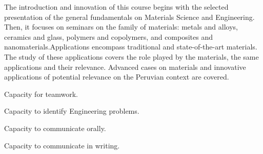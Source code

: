 
\begin{syllabus}


\begin{justification}
The introduction and innovation of this course begins with the selected presentation of the general fundamentals on Materials Science and Engineering.
Then, it focuses on seminars on the family of materials: metals and alloys, ceramics and glass, polymers and copolymers, and composites and nanomaterials.Applications encompass traditional and state-of-the-art materials. 
The study of these applications covers the role played by the materials, the same applications and their relevance. Advanced cases on materials and innovative applications of potential relevance on the Peruvian context are covered.

\end{justification}

\begin{goals}
\item Capacity for teamwork.
\item Capacity to identify Engineering problems.
\item Capacity to communicate orally.
\item Capacity to communicate in writing.
\end{goals}

% 



\end{syllabus}
